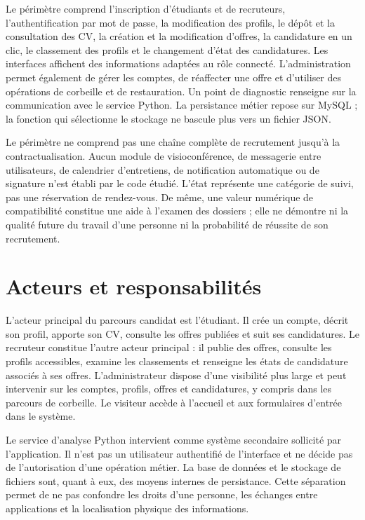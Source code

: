 Le périmètre comprend l'inscription d'étudiants et de recruteurs, l'authentification par mot de passe, la modification des profils, le dépôt et la consultation des CV, la création et la modification d'offres, la candidature en un clic, le classement des profils et le changement d'état des candidatures. Les interfaces affichent des informations adaptées au rôle connecté. L'administration permet également de gérer les comptes, de réaffecter une offre et d'utiliser des opérations de corbeille et de restauration. Un point de diagnostic renseigne sur la communication avec le service Python. La persistance métier repose sur MySQL ; la fonction qui sélectionne le stockage ne bascule plus vers un fichier JSON.

Le périmètre ne comprend pas une chaîne complète de recrutement jusqu'à la contractualisation. Aucun module de visioconférence, de messagerie entre utilisateurs, de calendrier d'entretiens, de notification automatique ou de signature n'est établi par le code étudié. L'état  représente une catégorie de suivi, pas une réservation de rendez-vous. De même, une valeur numérique de compatibilité constitue une aide à l'examen des dossiers ; elle ne démontre ni la qualité future du travail d'une personne ni la probabilité de réussite de son recrutement.

\section{Acteurs et responsabilités}

L'acteur principal du parcours candidat est l'étudiant. Il crée un compte, décrit son profil, apporte son CV, consulte les offres publiées et suit ses candidatures. Le recruteur constitue l'autre acteur principal : il publie des offres, consulte les profils accessibles, examine les classements et renseigne les états de candidature associés à ses offres. L'administrateur dispose d'une visibilité plus large et peut intervenir sur les comptes, profils, offres et candidatures, y compris dans les parcours de corbeille. Le visiteur accède à l'accueil et aux formulaires d'entrée dans le système.

Le service d'analyse Python intervient comme système secondaire sollicité par l'application. Il n'est pas un utilisateur authentifié de l'interface et ne décide pas de l'autorisation d'une opération métier. La base de données et le stockage de fichiers sont, quant à eux, des moyens internes de persistance. Cette séparation permet de ne pas confondre les droits d'une personne, les échanges entre applications et la localisation physique des informations.

